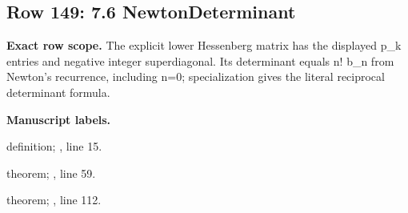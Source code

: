\subsection{Row 149: 7.6 NewtonDeterminant}
\label{row:149}
\textbf{Exact row scope.} The explicit lower Hessenberg matrix has the displayed p\_k entries and negative integer superdiagonal. Its determinant equals n! b\_n from Newton's recurrence, including n=0; specialization gives the literal reciprocal determinant formula.\par\smallskip
\textbf{Manuscript labels.} \par\smallskip
{\small{}\par}
{\footnotesize\color{muted}definition; , line 15.\par}\smallskip
{\small{}\par}
{\footnotesize\color{muted}theorem; , line 59.\par}\smallskip
{\small{}\par}
{\footnotesize\color{muted}theorem; , line 112.\par}\smallskip
{}
